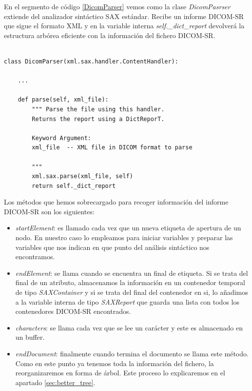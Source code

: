 En el segmento de código \ref{DicomParser} vemos como la clase \emph{DicomPasrser} extiende del analizador sintáctico SAX estándar. Recibe un informe DICOM-SR que sigue el formato XML y en la variable interna \emph{self.\_dict\_report} devolverá la estructura arbórea eficiente con la información del fichero DICOM-SR.\par

\lstset{escapechar=@,style=python}
\begin{lstlisting}[label=DicomParser,caption=Clase que analiza sintácticamente un fichero DICOM-SR]

class DicomParser(xml.sax.handler.ContentHandler):
    
    ...

    def parse(self, xml_file):
        """ Parse the file using this handler.
        Returns the report using a DictReporT.

        Keyword Argument:
        xml_file  -- XML file in DICOM format to parse

        """
        xml.sax.parse(xml_file, self)
        return self._dict_report

\end{lstlisting}

Los métodos que hemos sobrecargado para recoger información del informe DICOM-SR son los siguientes:
\begin{itemize}
\item \emph{startElement}: es llamado cada vez que un nueva etiqueta de apertura de un nodo. En nuestro caso lo empleamos para iniciar variables y preparar las variables que nos indican en que punto del análisis sintáctico nos encontramos.
\item \emph{endElement}: se llama cuando se encuentra un final de etiqueta. Si se trata del final de un atributo, almacenamos la información en un contenedor temporal de tipo \emph{SAXContainer} y si se trata del final del contenedor en si, lo añadimos a la variable interna de tipo \emph{SAXReport} que guarda una lista con todos los contenedores DICOM-SR encontrados. 
\item \emph{characters}: se llama cada vez que se lee un carácter y este es almacenado en un buffer.
\item \emph{endDocument}: finalmente cuando termina el documento se llama este método. Como en este punto ya tenemos toda la información del fichero, la reorganizaremos en forma de árbol. Este proceso lo explicaremos en el apartado \ref{sec:better_tree}.
\end{itemize}\medskip\par

